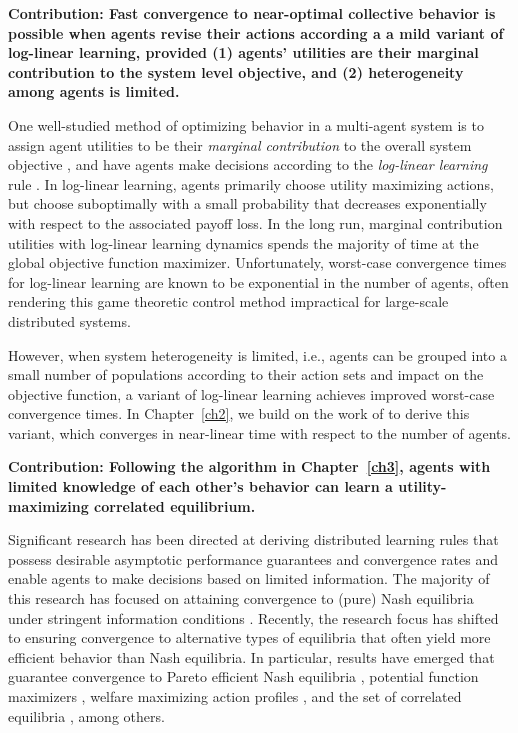\noindent \textbf{Contribution: Fast convergence to near-optimal collective behavior is possible when agents revise their actions according a a mild variant of log-linear learning, provided (1) agents' utilities are their marginal contribution to the system level objective, and (2) heterogeneity among agents is limited.}


One well-studied method of optimizing behavior in a multi-agent system is to assign agent utilities to be their {\it marginal contribution} to the overall system objective \cite{Wolpert1999}, and have agents make decisions according to the {\it log-linear learning} rule \cite{Blume1993}. In log-linear learning, agents primarily choose utility maximizing actions, but choose suboptimally with a small probability that decreases exponentially with respect to the associated payoff loss. In the long run, marginal contribution utilities with log-linear learning dynamics spends the majority of time at the global objective function maximizer. Unfortunately, worst-case convergence times for log-linear learning are known to be exponential in the number of agents, \cite{Shah2010} often rendering this game theoretic control method impractical for large-scale distributed systems. 

However, when system heterogeneity is limited, i.e., agents can be grouped into a small number of populations according to their action sets and impact on the objective function, a variant of log-linear learning achieves improved worst-case convergence times. In Chapter~\ref{ch2}, we build on the work of \cite{Shah2010} to derive this variant, which converges in near-linear time with respect to the number of agents. 


\smallskip

\noindent\textbf{Contribution: Following the algorithm in Chapter~\ref{ch3}, agents with limited knowledge of each other's behavior can learn a utility-maximizing correlated equilibrium.}


Significant research has been directed at deriving distributed learning rules that possess desirable asymptotic performance guarantees and convergence rates and enable agents to make decisions based on limited information. The majority of this research has focused on attaining convergence to (pure) Nash equilibria under stringent information conditions \cite{Young2009, Frihauf2012, Foster2006, Boussaton2012, Poveda2013, Gharesifard2012}. Recently, the research focus has shifted to ensuring convergence to alternative types of equilibria that often yield more efficient behavior than Nash equilibria.  In particular, results have emerged that guarantee convergence to Pareto efficient Nash equilibria \cite{Marden2009,Pradelski2012}, potential function maximizers \cite{Blume1993, Marden2012}, welfare maximizing action profiles \cite{Marden2011, Arieli2012}, and the set of correlated equilibria \cite{Hart2000,Marden2013c,Aumann1987,Foster1997}, among others.  

